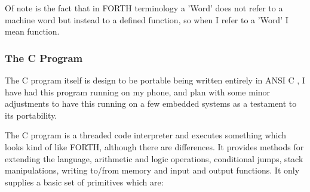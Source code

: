 \documentclass	[a4paper, 10pt]	{article}
\begin{document}
    Of note is the fact that in FORTH terminology a 'Word' does not refer to a machine
    word but instead to a defined function, so when I refer to a 'Word' I mean function.

      \subsubsection{The C Program}

      The C program itself is design to be portable being written entirely in ANSI C \cite{ANSIC}, 
      I have had this program running on my phone, and plan with some minor adjustments
      to have this running on a few embedded systems as a testament to its portability.

      The C program is a threaded code interpreter and executes something which looks
      kind of like FORTH, although there are differences. It provides methods for
      extending the language, arithmetic and logic operations, conditional jumps,
      stack manipulations, writing to/from memory and input and output functions. It
      only supplies a basic set of primitives which are:
\end{document}
